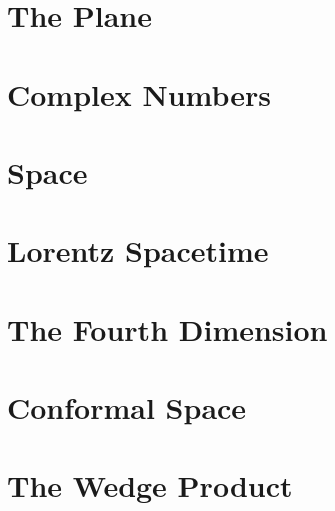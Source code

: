 \section{The Plane}

\section{Complex Numbers}

\section{Space}

\section{Lorentz Spacetime}

\section{The Fourth Dimension}

\section{Conformal Space}

\section{The Wedge Product}
